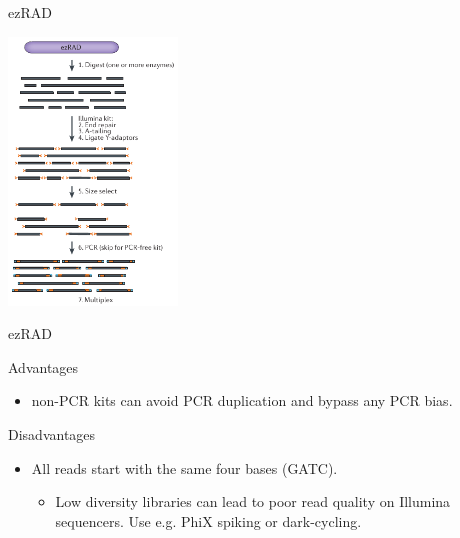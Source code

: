 \documentclass[presentation]{beamer}
\begin{document}
\begin{frame}[label=sec-2-3-1]{ezRAD \citep{Toonen2013}}
\begin{center}
\includegraphics[width=4.5cm]{Andrews2016ezRAD.png}


\tiny{\citep{Andrews2016}}
\end{center}
\end{frame}
\begin{frame}[label=sec-2-3-2]{ezRAD \citep{Toonen2013}}
\begin{block}{Advantages}
\begin{itemize}
\item non-PCR kits can avoid PCR duplication and bypass any PCR bias.
\end{itemize}
\end{block}
\begin{block}{Disadvantages}
\begin{itemize}
\item All reads start with the same four bases (GATC).
\begin{itemize}
\item Low diversity libraries can lead to poor read quality on Illumina
sequencers. Use e.g. PhiX spiking or dark-cycling.
\end{itemize}
\end{itemize}
\end{block}
\end{frame}
\end{document}
